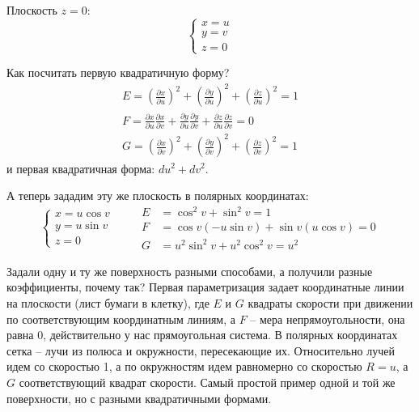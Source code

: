 \documentclass[main]{subfiles}
\begin{document}
\begin{example}
    Плоскость $z = 0$:
    \[\begin{cases}
            x = u \\
            y = v \\
            z = 0
        \end{cases}\]

    Как посчитать первую квадратичную форму?
    \begin{gather*}
        E = \left( \frac{\partial x}{\partial u}\right)^2 + \left(\frac{\partial y}{\partial u}\right)^2 + \left(\frac{\partial z}{\partial u}\right)^2 =1 \\
        F = \frac{\partial x}{\partial u}\frac{\partial x}{\partial v} +\frac{\partial y}{\partial u}\frac{\partial y}{\partial v} + \frac{\partial z}{\partial u}\frac{\partial z}{\partial v} = 0\\
        G = \left( \frac{\partial x}{\partial v}\right)^2 + \left(\frac{\partial y}{\partial v}\right)^2 + \left(\frac{\partial z}{\partial v}\right)^2 =1
    \end{gather*}
    и первая квадратичная форма: $du^2 + dv^2$.
\end{example}
\begin{example}
    А теперь зададим эту же плоскость в полярных координатах:
    \[\begin{cases}
            x = u \cos v \\
            y = u \sin v \\
            z = 0
        \end{cases}\qquad
        \begin{aligned}
            E & = \cos^2 v + \sin^2 v = 1                   \\
            F & = \cos v (-u \sin v) + \sin v (u\cos v) = 0 \\
            G & = u^2 \sin^2v + u^2 \cos^2 v = u^2
        \end{aligned}\]
\end{example}
Задали одну и ту же поверхность разными способами, а получили разные коэффициенты, почему так?
Первая параметризация задает координатные линии на плоскости (лист бумаги в клетку),
где $E$ и $G$ квадраты скорости при движении по соответствующим координатным линиям, а $F$ -- мера непрямоугольности, она равна 0, действительно у нас прямоугольная система.
В полярных координатах сетка -- лучи из полюса и окружности, пересекающие их.
Относительно лучей идем со скоростью 1, а по окружностям идем равномерно со скоростью $R=u$, а $G$ соответствующий квадрат скорости.
Самый простой пример одной и той же поверхности, но с разными квадратичными формами.
\end{document}
